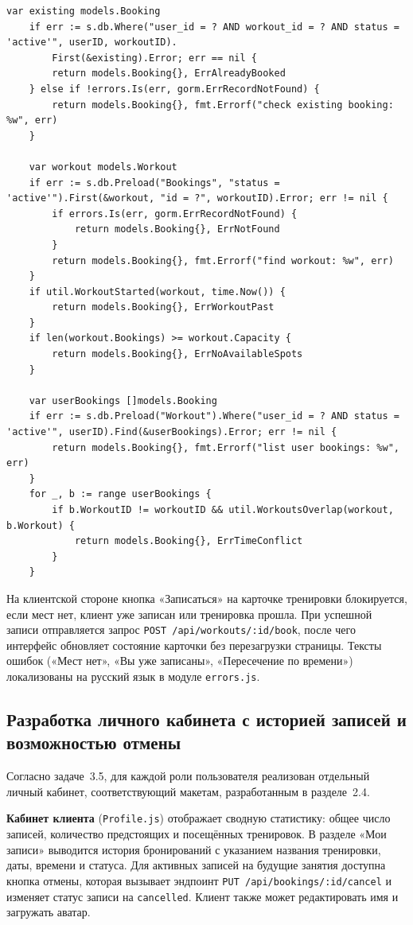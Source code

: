 \begin{lstlisting}[caption={Проверка условий при записи на тренировку (workoutService.go, стр.~194--224)}, label={lst:book}]
	var existing models.Booking
	if err := s.db.Where("user_id = ? AND workout_id = ? AND status = 'active'", userID, workoutID).
		First(&existing).Error; err == nil {
		return models.Booking{}, ErrAlreadyBooked
	} else if !errors.Is(err, gorm.ErrRecordNotFound) {
		return models.Booking{}, fmt.Errorf("check existing booking: %w", err)
	}

	var workout models.Workout
	if err := s.db.Preload("Bookings", "status = 'active'").First(&workout, "id = ?", workoutID).Error; err != nil {
		if errors.Is(err, gorm.ErrRecordNotFound) {
			return models.Booking{}, ErrNotFound
		}
		return models.Booking{}, fmt.Errorf("find workout: %w", err)
	}
	if util.WorkoutStarted(workout, time.Now()) {
		return models.Booking{}, ErrWorkoutPast
	}
	if len(workout.Bookings) >= workout.Capacity {
		return models.Booking{}, ErrNoAvailableSpots
	}

	var userBookings []models.Booking
	if err := s.db.Preload("Workout").Where("user_id = ? AND status = 'active'", userID).Find(&userBookings).Error; err != nil {
		return models.Booking{}, fmt.Errorf("list user bookings: %w", err)
	}
	for _, b := range userBookings {
		if b.WorkoutID != workoutID && util.WorkoutsOverlap(workout, b.Workout) {
			return models.Booking{}, ErrTimeConflict
		}
	}
\end{lstlisting}

На клиентской стороне кнопка «Записаться» на карточке тренировки блокируется,
если мест нет, клиент уже записан или тренировка прошла. При успешной записи
отправляется запрос \texttt{POST /api/workouts/:id/book}, после чего интерфейс
обновляет состояние карточки без перезагрузки страницы. Тексты ошибок
(«Мест нет», «Вы уже записаны», «Пересечение по времени») локализованы
на русский язык в модуле \texttt{errors.js}.

\subsection{Разработка личного кабинета с историей записей и возможностью отмены}

Согласно задаче~3.5, для каждой роли пользователя реализован отдельный
личный кабинет, соответствующий макетам, разработанным в разделе~2.4.

\textbf{Кабинет клиента} (\texttt{Profile.js}) отображает сводную статистику:
общее число записей, количество предстоящих и посещённых тренировок. В разделе
«Мои записи» выводится история бронирований с указанием названия тренировки,
даты, времени и статуса. Для активных записей на будущие занятия доступна
кнопка отмены, которая вызывает эндпоинт \texttt{PUT /api/bookings/:id/cancel}
и изменяет статус записи на \texttt{cancelled}. Клиент также может редактировать
имя и загружать аватар.

